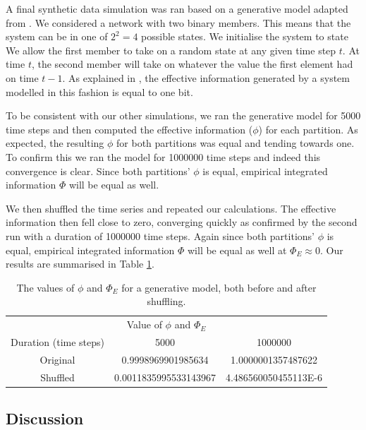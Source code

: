 \documentclass[a4paper,11pt]{article}
\begin{document}
A final synthetic data simulation was ran based on a generative model adapted from \cite{WikimediaFoundation2015}. We considered a network with two binary members. This means that the system can be in one of $2^2 = 4$ possible states. We initialise the system to state We allow the first member to take on a random state at any given time step $t$. At time $t$, the second member will take on whatever the value the first element had on time $t-1$. As explained in \cite{WikimediaFoundation2015}, the effective information generated by a system modelled in this fashion is equal to one bit.

To be consistent with our other simulations, we ran the generative model for 5000 time steps and then computed the effective information ($\phi$) for each partition. As expected, the resulting $\phi$ for both partitions was equal and tending towards one. To confirm this we ran the model for 1000000 time steps and indeed this convergence is clear. Since both partitions' $\phi$ is equal, empirical integrated information $\Phi$ will be equal as well.

We then shuffled the time series and repeated our calculations. The effective information then fell close to zero, converging quickly as confirmed by the second run with a duration of 1000000 time steps. Again since both partitions' $\phi$ is equal, empirical integrated information $\Phi$ will be equal as well at $\Phi_E \approx 0$. Our results are summarised in Table \ref{tab:synth-generative}.

\begin{table}[H]
\centering
\begin{tabular}{ c | c c }
\multicolumn{3}{c}{Value of $\phi$ and $\Phi_E$} \\ [2mm]
Duration (time steps) & 5000 & 1000000\\
\hline
Original & 0.9998969901985634 & 1.0000001357487622 \\
Shuffled & 0.0011835995533143967 & 4.486560050455113E-6\\
\end{tabular}
\caption{
	The values of $\phi$ and $\Phi_E$ for a generative model, both before and after shuffling.
	\label{tab:synth-generative}
}
\end{table}

\subsection{Discussion}
\end{document}
